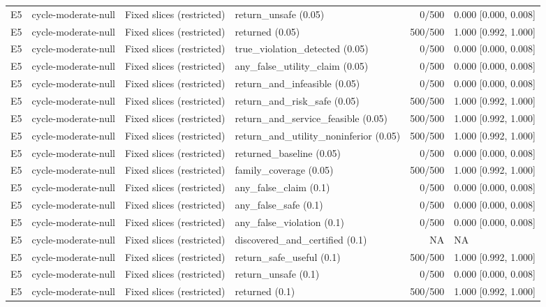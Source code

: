 \begin{longtable}{p{.04\linewidth}p{.18\linewidth}p{.19\linewidth}p{.16\linewidth}r p{.21\linewidth}}
E5 & cycle-moderate-null & Fixed slices (restricted) & return\_unsafe (0.05) & 0/500 & 0.000 [0.000, 0.008]\\
E5 & cycle-moderate-null & Fixed slices (restricted) & returned (0.05) & 500/500 & 1.000 [0.992, 1.000]\\
E5 & cycle-moderate-null & Fixed slices (restricted) & true\_violation\_detected (0.05) & 0/500 & 0.000 [0.000, 0.008]\\
E5 & cycle-moderate-null & Fixed slices (restricted) & any\_false\_utility\_claim (0.05) & 0/500 & 0.000 [0.000, 0.008]\\
E5 & cycle-moderate-null & Fixed slices (restricted) & return\_and\_infeasible (0.05) & 0/500 & 0.000 [0.000, 0.008]\\
E5 & cycle-moderate-null & Fixed slices (restricted) & return\_and\_risk\_safe (0.05) & 500/500 & 1.000 [0.992, 1.000]\\
E5 & cycle-moderate-null & Fixed slices (restricted) & return\_and\_service\_feasible (0.05) & 500/500 & 1.000 [0.992, 1.000]\\
E5 & cycle-moderate-null & Fixed slices (restricted) & return\_and\_utility\_noninferior (0.05) & 500/500 & 1.000 [0.992, 1.000]\\
E5 & cycle-moderate-null & Fixed slices (restricted) & returned\_baseline (0.05) & 0/500 & 0.000 [0.000, 0.008]\\
E5 & cycle-moderate-null & Fixed slices (restricted) & family\_coverage (0.05) & 500/500 & 1.000 [0.992, 1.000]\\
E5 & cycle-moderate-null & Fixed slices (restricted) & any\_false\_claim (0.1) & 0/500 & 0.000 [0.000, 0.008]\\
E5 & cycle-moderate-null & Fixed slices (restricted) & any\_false\_safe (0.1) & 0/500 & 0.000 [0.000, 0.008]\\
E5 & cycle-moderate-null & Fixed slices (restricted) & any\_false\_violation (0.1) & 0/500 & 0.000 [0.000, 0.008]\\
E5 & cycle-moderate-null & Fixed slices (restricted) & discovered\_and\_certified (0.1) & NA & NA\\
E5 & cycle-moderate-null & Fixed slices (restricted) & return\_safe\_useful (0.1) & 500/500 & 1.000 [0.992, 1.000]\\
E5 & cycle-moderate-null & Fixed slices (restricted) & return\_unsafe (0.1) & 0/500 & 0.000 [0.000, 0.008]\\
E5 & cycle-moderate-null & Fixed slices (restricted) & returned (0.1) & 500/500 & 1.000 [0.992, 1.000]\\

\end{longtable}
